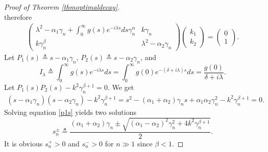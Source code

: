 \documentclass[12pt,reqno]{article}
\begin{document}
\begin{proof}[Proof of Theorem \ref{thmoptimaldecay}]
\[		\]
		therefore
		\begin{align}\label{lamdak}
			\begin{pmatrix}
				\lambda^2 - \alpha_1 \gamma_n + \displaystyle\int_0^\infty g(s) e^{-i\lambda s} ds\gamma_n^\alpha & k\gamma_n \\
				k\gamma_n^\beta & \lambda^2 - \alpha_2 \gamma_n
			\end{pmatrix}
			\begin{pmatrix}
				k_1 \\
				k_2
			\end{pmatrix}
			=
			\begin{pmatrix}
				0 \\
				1
			\end{pmatrix}.
		\end{align}
		Let $P_1(s)\triangleq s-\alpha_1\gamma_n$, $P_2(s)\triangleq s-\alpha_2\gamma_n$, and
		\begin{equation}\label{ilamda}
			I_\lambda\triangleq\int_0^\infty g(s)e^{-i\lambda s}ds
			=\int_0^\infty g(0)e^{-(\delta+i\lambda)s}ds
			=\frac{g(0)}{\delta+i\lambda}.
		\end{equation}
Let $P_1(s)P_2(s)-k^2\gamma_n^{\beta+1}=0$. We get
		\begin{align}\label{p1s}
		(s-\alpha_1\gamma_n)(s-\alpha_2\gamma_n)-k^2\gamma_n^{\beta+1} =s^2-(\alpha_1+\alpha_2)\gamma_n s+\alpha_1\alpha_2\gamma_n^2-k^2\gamma_n^{\beta+1}=0.
		\end{align}
		Solving equation \eqref{p1s} yields two solutions
		\begin{equation}\label{sn}
			s_n^\pm \triangleq \frac{(\alpha_1+\alpha_2)\gamma_n \pm \sqrt{(\alpha_1-\alpha_2)^2\gamma_n^2 + 4k^2\gamma_n^{\beta+1}}}{2}.
		\end{equation}
It is obvious $s_n^+>0$ and $s_n^->0$ for $n\gg1$ since $\beta<1$.


\end{proof}
\end{document}
